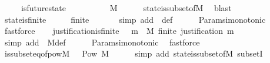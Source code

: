 \begin{isabellebody}
\ \ \ \ {\isasymlongrightarrow}\ is{\isacharunderscore}future{\isacharunderscore}state{\isacharparenleft}{\isasymsigma}{\isacharcomma}\ {\isasymsigma}{\isacharprime}{\isacharparenright}\isanewline
\ \ \ \ {\isasymlongrightarrow}\ {\isasymsigma}{\isacharprime}\ {\isacharminus}\ {\isasymsigma}\ {\isasymsubseteq}\ M{\isachardoublequoteclose}\isanewline
%
\isadelimproof
\ \ \ \ %
\endisadelimproof
%
\isatagproof
{}\isamarkupfalse%
\ state{\isacharunderscore}is{\isacharunderscore}subset{\isacharunderscore}of{\isacharunderscore}M\ \isamarkupfalse%
\ blast%
\endisatagproof
{\isafoldproof}%
%
\isadelimproof
\isanewline
%
\endisadelimproof
\isanewline
\ \ \isamarkupfalse%
\ state{\isacharunderscore}is{\isacharunderscore}finite\ {\isacharcolon}\ {\isachardoublequoteopen}{\isasymforall}\ {\isasymsigma}\ {\isasymin}\ {\isasymSigma}{\isachardot}\ finite\ {\isasymsigma}{\isachardoublequoteclose}\isanewline
%
\isadelimproof
\ \ \ \ %
\endisadelimproof
%
\isatagproof
{}\isamarkupfalse%
\ {\isacharparenleft}simp\ add{\isacharcolon}\ \ {\isasymSigma}{\isacharunderscore}def{\isacharparenright}\isanewline
\ \ \ \ \isamarkupfalse%
\ Params{\isachardot}{\isasymSigma}i{\isacharunderscore}monotonic\ \isamarkupfalse%
\ fastforce%
\endisatagproof
{\isafoldproof}%
%
\isadelimproof
\isanewline
%
\endisadelimproof
\isanewline
\ \ \isamarkupfalse%
\ justification{\isacharunderscore}is{\isacharunderscore}finite\ {\isacharcolon}\ {\isachardoublequoteopen}{\isasymforall}\ m\ {\isasymin}\ M{\isachardot}\ finite\ {\isacharparenleft}justification\ m{\isacharparenright}{\isachardoublequoteclose}\isanewline
%
\isadelimproof
\ \ \ \ %
\endisadelimproof
%
\isatagproof
{}\isamarkupfalse%
\ {\isacharparenleft}simp\ add{\isacharcolon}\ \ M{\isacharunderscore}def{\isacharparenright}\isanewline
\ \ \ \ \isamarkupfalse%
\ Params{\isachardot}{\isasymSigma}i{\isacharunderscore}monotonic\ \isamarkupfalse%
\ fastforce%
\endisatagproof
{\isafoldproof}%
%
\isadelimproof
\isanewline
%
\endisadelimproof
\isanewline
\ \ \isamarkupfalse%
\ {\isasymSigma}{\isacharunderscore}is{\isacharunderscore}subseteq{\isacharunderscore}of{\isacharunderscore}pow{\isacharunderscore}M{\isacharcolon}\ {\isachardoublequoteopen}{\isasymSigma}\ {\isasymsubseteq}\ Pow\ M{\isachardoublequoteclose}\isanewline
%
\isadelimproof
\ \ \ \ %
\endisadelimproof
%
\isatagproof
{}\isamarkupfalse%
\ {\isacharparenleft}simp\ add{\isacharcolon}\ state{\isacharunderscore}is{\isacharunderscore}subset{\isacharunderscore}of{\isacharunderscore}M\ subsetI{\isacharparenright}%

\end{isabellebody}
